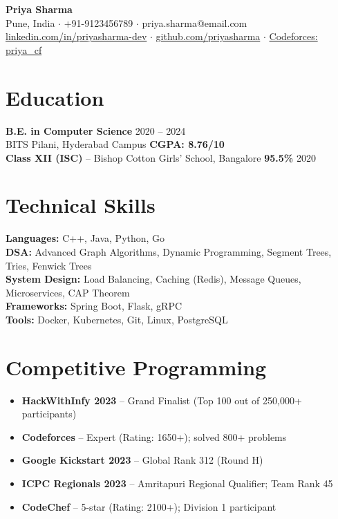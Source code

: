 \documentclass[10pt,a4paper]{article}
\begin{document}
\begin{center}
{\LARGE\bfseries Priya Sharma}\\[5pt]
{\small Pune, India $\cdot$ +91-9123456789 $\cdot$ priya.sharma@email.com}\\[2pt]
{\small \href{https://linkedin.com/in/priyasharma-dev}{linkedin.com/in/priyasharma-dev} $\cdot$ \href{https://github.com/priyasharma}{github.com/priyasharma} $\cdot$ \href{https://codeforces.com/profile/priya_cf}{Codeforces: priya\_cf}}
\end{center}

\section{Education}

\textbf{B.E. in Computer Science} \hfill 2020 -- 2024\\
BITS Pilani, Hyderabad Campus \hfill \textbf{CGPA: 8.76/10}\\[3pt]
\textbf{Class XII (ISC)} -- Bishop Cotton Girls' School, Bangalore \hfill \textbf{95.5\%} \hfill 2020

\section{Technical Skills}

\textbf{Languages:} C++, Java, Python, Go\\
\textbf{DSA:} Advanced Graph Algorithms, Dynamic Programming, Segment Trees, Tries, Fenwick Trees\\
\textbf{System Design:} Load Balancing, Caching (Redis), Message Queues, Microservices, CAP Theorem\\
\textbf{Frameworks:} Spring Boot, Flask, gRPC\\
\textbf{Tools:} Docker, Kubernetes, Git, Linux, PostgreSQL

\section{Competitive Programming}

\begin{itemize}
    \item \textbf{HackWithInfy 2023} -- Grand Finalist (Top 100 out of 250,000+ participants)
    \item \textbf{Codeforces} -- Expert (Rating: 1650+); solved 800+ problems
    \item \textbf{Google Kickstart 2023} -- Global Rank 312 (Round H)
    \item \textbf{ICPC Regionals 2023} -- Amritapuri Regional Qualifier; Team Rank 45
    \item \textbf{CodeChef} -- 5-star (Rating: 2100+); Division 1 participant
\end{itemize}
\end{document}
